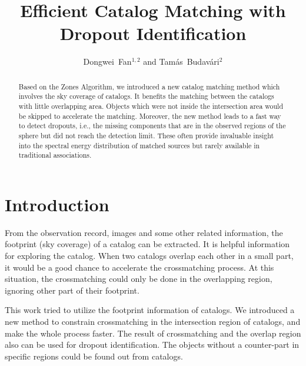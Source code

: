 
\resetcounters



\title{Efficient Catalog Matching with Dropout Identification}
\author{Dongwei~Fan$^{1,2}$ and Tam\'as~Budav\'ari$^2$}


\begin{abstract}
Based on the Zones Algorithm, we introduced a new catalog matching method which involves the sky coverage of catalogs. It benefits the matching between the catalogs with little overlapping area. Objects which were not inside the intersection area would be skipped to accelerate the matching. Moreover, the new method leads to a fast way to detect dropouts, i.e., the missing components that are in the observed regions of the sphere but did not reach the detection limit. These often provide invaluable insight into the spectral energy distribution of matched sources but rarely available in traditional associations.
\end{abstract}

\section{Introduction}
From the observation record, images and some other related information, the footprint (sky coverage) of a catalog can be extracted. It is helpful information for exploring the catalog. When two catalogs overlap each other in a small part, it would be a good chance to accelerate the crossmatching process. At this situation, the crossmatching could only be done in the overlapping region, ignoring other part of their footprint.

This work tried to utilize the footprint information of catalogs. We introduced a new method to constrain crossmatching in the intersection region of catalogs, and make the whole process faster. The result of crossmatching and the overlap region also can be used for dropout identification. The objects without a counter-part in specific regions could be found out from catalogs.

